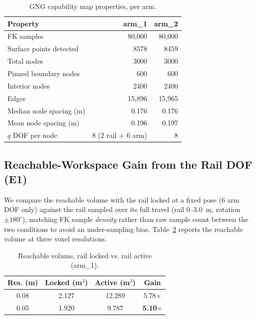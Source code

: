 \documentclass[conference]{IEEEtran}
\begin{document}
\begin{table}[htbp]
\caption{GNG capability map properties, per arm.}
\begin{center}
\begin{tabular}{|l|r|r|}
\hline
\textbf{Property} & \textbf{arm\_1} & \textbf{arm\_2} \\
\hline
FK samples & 80{,}000 & 80{,}000 \\
\hline
Surface points detected & 8578 & 8459 \\
\hline
Total nodes & 3000 & 3000 \\
\hline
Pinned boundary nodes & 600 & 600 \\
\hline
Interior nodes & 2400 & 2400 \\
\hline
Edges & 15{,}896 & 15{,}965 \\
\hline
Median node spacing (m) & 0.176 & 0.176 \\
\hline
Mean node spacing (m) & 0.196 & 0.197 \\
\hline
$q$ DOF per node & 8 (2 rail + 6 arm) & 8 \\
\hline
\end{tabular}
\label{tab:e0}
\end{center}
\end{table}

\subsection{Reachable-Workspace Gain from the Rail DOF (E1)}

We compare the reachable volume with the rail locked at a fixed pose (6 arm DOF
only) against the rail sampled over its full travel (rail 0--3.0~m, rotation
$\pm180^{\circ}$), matching FK sample \emph{density} rather than raw sample count
between the two conditions to avoid an under-sampling bias. Table~\ref{tab:e1}
reports the reachable volume at three voxel resolutions.

\begin{table}[htbp]
\caption{Reachable volume, rail locked vs. rail active (arm\_1).}
\begin{center}
\begin{tabular}{|c|c|c|c|}
\hline
\textbf{Res. (m)} & \textbf{Locked (m$^3$)} & \textbf{Active (m$^3$)} & \textbf{Gain} \\
\hline
0.08 & 2.127 & 12.289 & 5.78$\times$ \\
\hline
0.05 & 1.920 & 9.787 & \textbf{5.10$\times$} \\
\hline
\end{tabular}
\label{tab:e1}
\end{center}
\end{table}
\end{document}
